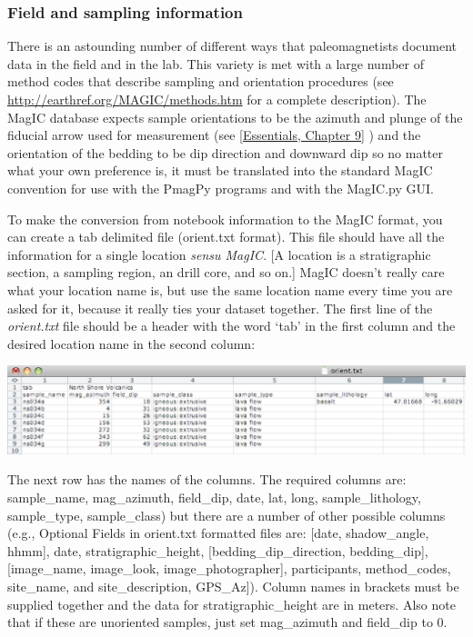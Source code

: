 \documentclass[11pt]{book}
\begin{document}
{\subsubsection{Field  and sampling information}
\label{sect:field_info}

 There is an astounding number of different ways that paleomagnetists document data in the field and in the lab. This variety is met with a large number  of method codes that describe sampling and orientation procedures (see \url{http://earthref.org/MAGIC/methods.htm} for a complete description).   The MagIC database expects sample orientations to be the azimuth and plunge of the fiducial arrow used for measurement (see  \href{http://magician.ucsd.edu/Essentials_2/WebBook2ch2.html#ch2}{[Essentials, Chapter 9]} )  and the orientation of the bedding to be dip direction and downward dip so no matter what your own preference is, it must be translated into the standard MagIC convention for use with the PmagPy programs and with the MagIC.py GUI.  

 
 To make the conversion from notebook information to the MagIC format,  you can create a tab delimited file (orient.txt format).   This file should have all the information for a single location {\it sensu MagIC}.  [A location is a stratigraphic section,  a sampling region,  an drill core, and so on.]  MagIC doesn't really care what your location name is, but use the same location name every time you are asked for it, because it really ties your dataset together.   The first line of the {\it orient.txt} file should be a  header with the word `tab' in the first column and the desired location name in the second column:
 
  \includegraphics[width=15cm]{EPSfiles/orient.eps}
 
 The next row has the names of the columns.  The required columns are:  sample\_name, mag\_azimuth, field\_dip, date, lat, long, sample\_lithology, sample\_type, sample\_class) but there are a number of other possible columns (e.g., Optional Fields in orient.txt formatted files are: [date, shadow\_angle, hhmm], date, stratigraphic\_height, [bedding\_dip\_direction, bedding\_dip], [image\_name, image\_look, image\_photographer], participants, method\_codes, site\_name, and site\_description, GPS\_Az]).  Column names in brackets must be supplied together and the data for stratigraphic\_height are in meters.  Also note that if these are unoriented samples, just set mag\_azimuth and field\_dip to 0.  
 
}
\end{document}
